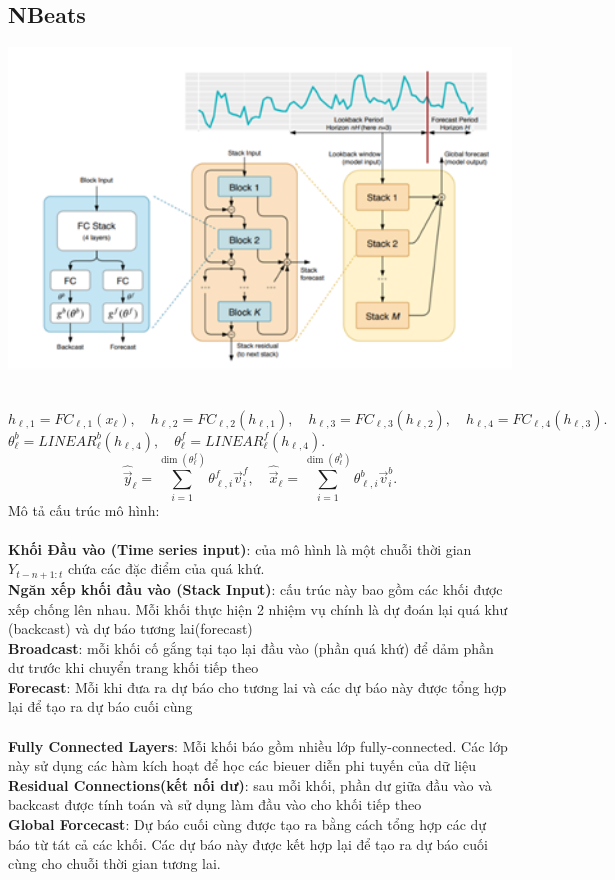 \subsection{NBeats}
\begin{minipage}{0.45\textwidth}
\centering
\includegraphics[width=1\textwidth]{resources/chapter-4/nbeats-1.png}
\end{minipage}
\\
\({h}_{\ell,1} = FC_{\ell,1}({x}_{\ell}), \quad {h}_{\ell,2} = FC_{\ell,2}({h}_{\ell,1}), \quad {h}_{\ell,3} = FC_{\ell,3}({h}_{\ell,2}), \quad {h}_{\ell,4} = FC_{\ell,4}({h}_{\ell,3}).\) \\
\(\theta^b_{\ell} = LINEAR_{\ell}^{b}({h}_{\ell,4}), \quad \theta^f_{\ell} = LINEAR_{\ell}^{f}({h}_{\ell,4}).\) \\

\[\widehat{\vec{y}}_{\ell} = \sum_{i=1}^{\dim(\theta^f_{\ell})} \theta^f_{\ell,i} \vec{v}^f_{i}, \quad  \widehat{\vec{x}}_{\ell} = \sum_{i=1}^{\dim(\theta^b_{\ell})} \theta^b_{\ell,i} \vec{v}^b_{i}.
\]
Mô tả cấu trúc mô hình: \\
\\
\textbf{Khối Đầu vào (Time series input)}: của mô hình là một chuỗi thời gian \(Y_{t-n+1:t}\) chứa các đặc điểm của quá khứ.\\
\textbf{Ngăn xếp khối đầu vào (Stack Input)}: cấu trúc này bao gồm các khối được xếp chống lên nhau. Mỗi khối thực hiện 2 nhiệm vụ chính là dự đoán lại quá khư (backcast) và dự báo tương lai(forecast)\\
\textbf{Broadcast}: mỗi khối cố  gắng tại tạo lại đầu vào (phần quá khứ) để dảm phần dư trước khi chuyển trang khối tiếp theo\\
\textbf{Forecast}: Mỗi khi đưa ra dự báo cho tương lai và các dự báo này được tổng hợp lại để tạo ra dự báo cuối cùng\\
\\
\textbf{Fully Connected Layers}: Mỗi khối báo gồm nhiều lớp fully-connected. Các lớp này sử dụng các hàm kích hoạt để học các bieuer diễn phi tuyến của dữ liệu\\
\textbf{Residual Connections(kết nối dư)}: sau mỗi khối, phần dư giữa đầu vào và backcast được tính toán và sử dụng làm đầu vào cho khối tiếp theo\\
\textbf{Global Forcecast}: Dự báo cuối cùng được tạo ra bằng cách tổng hợp các dự báo từ tát cả các khối. Các dự báo này được kết hợp lại để tạo ra dự báo cuối cùng cho chuỗi thời gian tương lai.\\
